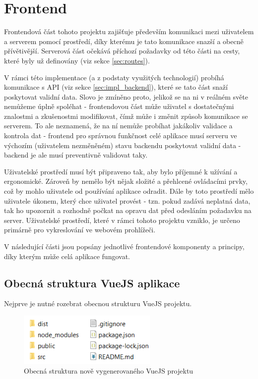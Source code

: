 \section{Frontend}\label{sec:impl_frontend}
Frontendová část tohoto projektu zajišťuje především komunikaci mezi uživatelem a serverem pomocí prostředí, díky kterému je tato komunikace snazší a obecně přívětivější. Serverová část očekává příchozí požadavky od této části na cesty, které byly už definovány (viz sekce \ref{sec:routes}).

V rámci této implementace (a z podstaty využitých technologií) probíhá komunikace s API (viz sekce \ref{sec:impl_backend}), které se tato část snaží poskytovat validní data. Slovo  je zmíněno proto, jelikož se na ni v reálném světe nemůžeme úplně spoléhat - frontendovou část může uživatel s dostatečnými znalostmi a zkušenostmi modifikovat, čímž může i změnit způsob komunikace se serverem. To ale neznamená, že na ní nemůže probíhat jakákoliv validace a kontrola dat - frontend pro správnou funkčnost celé aplikace musí serveru ve výchozím (uživatelem nezměněném) stavu backendu poskytovat validní data - backend je ale musí preventivně validovat taky.

Uživatelské prostředí musí být připraveno tak, aby bylo příjemné k užívání a ergonomické. Zároveň by nemělo být nějak složité a přehlcené ovládacími prvky, což by mohlo uživatele od používání aplikace odradit. Dále by toto prostředí mělo uživatele  úkonem, který chce uživatel provést - tzn. pokud zadává neplatná data, tak ho upozornit a rozhodně počkat na opravu dat před odesláním požadavku na server. Uživatelské prostředí, které v rámci tohoto projektu vzniklo, je určeno primárně pro vykreslování ve webovém prohlížeči.

V následující části jsou popsány jednotlivé frontendové komponenty a principy, díky kterým může celá aplikace fungovat.
	
	\subsection{Obecná struktura VueJS aplikace}
	Nejprve je nutné rozebrat obecnou strukturu VueJS projektu.
	
	\begin{figure}[H]
		\centering
		\includegraphics[width=0.6\textwidth]{img/vuejs_struktura.png} 
		\caption{Obecná struktura nově vygenerovaného VueJS projektu}
		\label{fig:vuejs_str}
	\end{figure}

